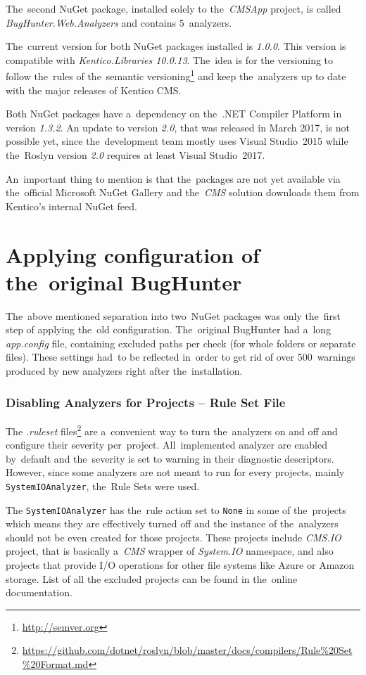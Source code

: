 \documentclass[
  digital, %
  table,   %
  lof,     %
  lot,     %
  oneside,
]{fithesis3}
\begin{document}
The~second NuGet package, installed solely to the~\textit{CMSApp} project, is called \textit{BugHunter.Web.Analyzers} and contains 5~analyzers.

The~current version for both NuGet packages installed is \textit{1.0.0}. This version is compatible with \textit{Kentico.Libraries 10.0.13}. The~idea is for the versioning to follow the~rules of the~semantic versioning\footnote{\url{http://semver.org}} and keep the~analyzers up to date with the major releases of Kentico CMS. 

Both NuGet packages have a~dependency on the~.NET Compiler Platform in version \textit{1.3.2}. An update to version \textit{2.0}, that was released in March 2017, is not possible yet, since the~development team mostly uses Visual Studio~2015 while the~Roslyn version \textit{2.0} requires at least Visual Studio~2017. 

An~important thing to mention is that the~packages are not yet available via the~official Microsoft NuGet Gallery and the~\textit{CMS} solution downloads them from Kentico's internal NuGet feed.

\section{Applying configuration of the~original BugHunter}
The~above mentioned separation into two~NuGet packages was only the~first step of applying the~old configuration. The~original BugHunter had a~long \textit{app.config} file, containing excluded paths per check (for whole folders or separate files). These settings had~to be reflected in~order to get rid of over 500~warnings produced by new analyzers right after the~installation.

\subsubsection{\textbf{Disabling Analyzers for Projects -- Rule Set File}}
The \textit{.ruleset} files\footnote{\url{https://github.com/dotnet/roslyn/blob/master/docs/compilers/Rule\%20Set\%20Format.md}} are a~convenient way to turn the~analyzers on and off and configure their severity per~project. All~implemented analyzer are enabled by~default and the~severity is set to warning in their diagnostic descriptors. However, since some analyzers are not meant to run for every projects, mainly \texttt{SystemIOAnalyzer}, the~Rule Sets were used. 

The \texttt{SystemIOAnalyzer} has the~rule action set to \texttt{None} in some of the~projects which means they are effectively turned off and the instance of the~analyzers should not be even created for those projects. These projects include \textit{CMS.IO} project, that is basically a~\textit{CMS} wrapper of \textit{System.IO} namespace, and also projects that provide I/O operations for other file systems like Azure or Amazon storage. List of all the excluded projects can be found in the~online documentation.
\end{document}
